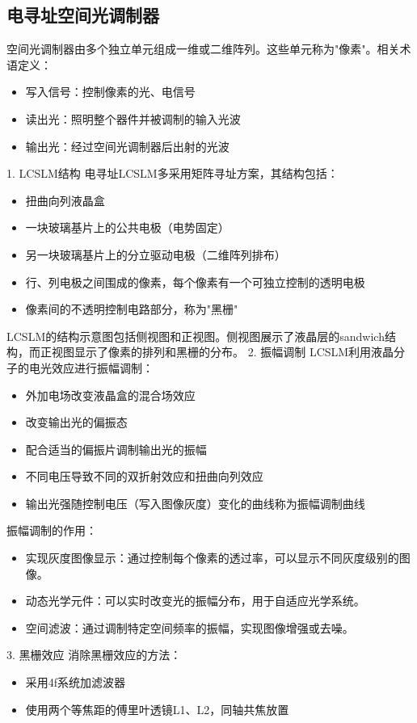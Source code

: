 \documentclass{whureport}
\begin{document}
\begin{multicols}{2}
\subsection{电寻址空间光调制器}
空间光调制器由多个独立单元组成一维或二维阵列。这些单元称为"像素"。相关术语定义：
\begin{itemize}
\item 写入信号：控制像素的光、电信号
\item 读出光：照明整个器件并被调制的输入光波
\item 输出光：经过空间光调制器后出射的光波
\end{itemize}
1. LCSLM结构
电寻址LCSLM多采用矩阵寻址方案，其结构包括：
\begin{itemize}
\item 扭曲向列液晶盒
\item 一块玻璃基片上的公共电极（电势固定）
\item 另一块玻璃基片上的分立驱动电极（二维阵列排布）
\item 行、列电极之间围成的像素，每个像素有一个可独立控制的透明电极
\item 像素间的不透明控制电路部分，称为"黑栅"
\end{itemize}
LCSLM的结构示意图包括侧视图和正视图。侧视图展示了液晶层的sandwich结构，而正视图显示了像素的排列和黑栅的分布。
2. 振幅调制
LCSLM利用液晶分子的电光效应进行振幅调制：
\begin{itemize}
\item 外加电场改变液晶盒的混合场效应
\item 改变输出光的偏振态
\item 配合适当的偏振片调制输出光的振幅
\item 不同电压导致不同的双折射效应和扭曲向列效应
\item 输出光强随控制电压（写入图像灰度）变化的曲线称为振幅调制曲线
\end{itemize}
振幅调制的作用：
\begin{itemize}
    \item 实现灰度图像显示：通过控制每个像素的透过率，可以显示不同灰度级别的图像。
    \item 动态光学元件：可以实时改变光的振幅分布，用于自适应光学系统。
    \item 空间滤波：通过调制特定空间频率的振幅，实现图像增强或去噪。
\end{itemize}
3. 黑栅效应
消除黑栅效应的方法：
\begin{itemize}
\item 采用4f系统加滤波器
\item 使用两个等焦距的傅里叶透镜L1、L2，同轴共焦放置

\end{itemize}
\end{multicols}
\end{document}
